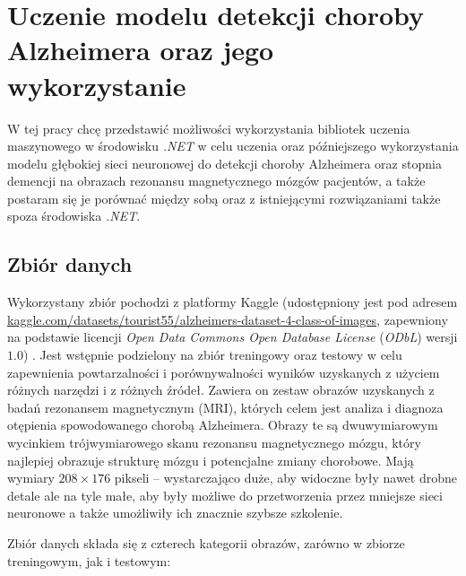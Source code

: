\chapter{Uczenie modelu detekcji choroby Alzheimera oraz jego wykorzystanie}

W tej pracy chcę przedstawić możliwości wykorzystania bibliotek uczenia maszynowego w środowisku \emph{.NET} w celu uczenia oraz późniejszego wykorzystania modelu głębokiej sieci neuronowej do detekcji choroby Alzheimera oraz stopnia demencji na obrazach rezonansu magnetycznego mózgów pacjentów, a także postaram się je porównać między sobą oraz z istniejącymi rozwiązaniami także spoza środowiska \emph{.NET}.

\section{Zbiór danych}

Wykorzystany zbiór pochodzi z platformy Kaggle (udostępniony jest pod adresem \url{kaggle.com/datasets/tourist55/alzheimers-dataset-4-class-of-images}, zapewniony na podstawie licencji \emph{Open Data Commons Open Database License} (\emph{ODbL}) wersji $1.0$) \cite{kaggle-alzheimers-dataset}.
Jest wstępnie podzielony na zbiór treningowy oraz testowy w celu zapewnienia powtarzalności i porównywalności wyników uzyskanych z użyciem różnych narzędzi i z różnych źródeł.
Zawiera on zestaw obrazów uzyskanych z badań rezonansem magnetycznym (MRI), których celem jest analiza i diagnoza otępienia spowodowanego chorobą Alzheimera.
Obrazy te są dwuwymiarowym wycinkiem trójwymiarowego skanu rezonansu magnetycznego mózgu, który najlepiej obrazuje strukturę mózgu i potencjalne zmiany chorobowe.
Mają wymiary $208 \times 176$ pikseli -- wystarczająco duże, aby widoczne były nawet drobne detale ale na tyle małe, aby były możliwe do przetworzenia przez mniejsze sieci neuronowe a także umożliwiły ich znacznie szybsze szkolenie.

Zbiór danych składa się z czterech kategorii obrazów, zarówno w zbiorze treningowym, jak i testowym:

